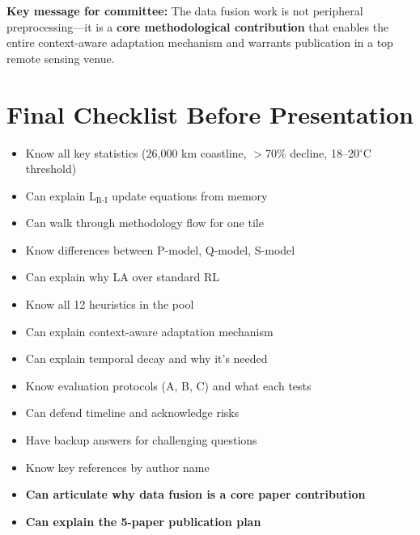 \documentclass[11pt]{article}
\begin{document}
\textbf{Key message for committee:} The data fusion work is not peripheral preprocessing---it is a \textbf{core methodological contribution} that enables the entire context-aware adaptation mechanism and warrants publication in a top remote sensing venue.

\section{Final Checklist Before Presentation}

\begin{itemize}
    \item[$\square$] Know all key statistics (26,000 km coastline, $>$70\% decline, 18--20$^\circ$C threshold)
    \item[$\square$] Can explain L$_{\text{R-I}}$ update equations from memory
    \item[$\square$] Can walk through methodology flow for one tile
    \item[$\square$] Know differences between P-model, Q-model, S-model
    \item[$\square$] Can explain why LA over standard RL
    \item[$\square$] Know all 12 heuristics in the pool
    \item[$\square$] Can explain context-aware adaptation mechanism
    \item[$\square$] Can explain temporal decay and why it's needed
    \item[$\square$] Know evaluation protocols (A, B, C) and what each tests
    \item[$\square$] Can defend timeline and acknowledge risks
    \item[$\square$] Have backup answers for challenging questions
    \item[$\square$] Know key references by author name
    \item[$\square$] \textbf{Can articulate why data fusion is a core paper contribution}
    \item[$\square$] \textbf{Can explain the 5-paper publication plan}
\end{itemize}
\end{document}
